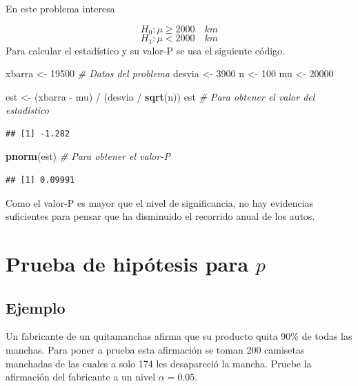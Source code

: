 \documentclass[10pt,]{krantz}
\makeatletter
\newenvironment{Shaded}{\begin{snugshade}}{\end{snugshade}}
\newcommand{\KeywordTok}[1]{\textcolor[rgb]{0.13,0.29,0.53}{\textbf{{#1}}}}
\newcommand{\DecValTok}[1]{\textcolor[rgb]{0.00,0.00,0.81}{{#1}}}
\newcommand{\StringTok}[1]{\textcolor[rgb]{0.31,0.60,0.02}{{#1}}}
\newcommand{\CommentTok}[1]{\textcolor[rgb]{0.56,0.35,0.01}{\textit{{#1}}}}
\newcommand{\NormalTok}[1]{{#1}}
\newenvironment{kframe}{%
\medskip{}
\setlength{\fboxsep}{.8em}
 \def\at@end@of@kframe{}%
 \ifinner\ifhmode%
  \def\at@end@of@kframe{\end{minipage}}%
  \begin{minipage}{\columnwidth}%
 \fi\fi%
 \def\FrameCommand##1{\hskip\@totalleftmargin \hskip-\fboxsep
 \colorbox{shadecolor}{##1}\hskip-\fboxsep
     \hskip-\linewidth \hskip-\@totalleftmargin \hskip\columnwidth}%
 \MakeFramed {\advance\hsize-\width
   \@totalleftmargin\z@ \linewidth\hsize
   \@setminipage}}%
 {\par\unskip\endMakeFramed%
 \at@end@of@kframe}
\renewenvironment{Shaded}{\begin{kframe}}{\end{kframe}}
\makeatother
\begin{document}
En este problema interesa

\[H_0: \mu \ge 2000 \quad km\] \[H_1: \mu < 2000 \quad km\] Para
calcular el estadístico y su valor-P se usa el siguiente código.

\begin{Shaded}
\begin{Highlighting}[]
\NormalTok{xbarra <-}\StringTok{ }\DecValTok{19500}  \CommentTok{# Datos del problema}
\NormalTok{desvia <-}\StringTok{ }\DecValTok{3900}
\NormalTok{n <-}\StringTok{ }\DecValTok{100}
\NormalTok{mu <-}\StringTok{ }\DecValTok{20000}

\NormalTok{est <-}\StringTok{ }\NormalTok{(xbarra -}\StringTok{ }\NormalTok{mu) /}\StringTok{ }\NormalTok{(desvia /}\StringTok{ }\KeywordTok{sqrt}\NormalTok{(n))}
\NormalTok{est  }\CommentTok{# Para obtener el valor del estadístico}
\end{Highlighting}
\end{Shaded}

\begin{verbatim}
## [1] -1.282
\end{verbatim}

\begin{Shaded}
\begin{Highlighting}[]
\KeywordTok{pnorm}\NormalTok{(est)  }\CommentTok{# Para obtener el valor-P}
\end{Highlighting}
\end{Shaded}

\begin{verbatim}
## [1] 0.09991
\end{verbatim}

Como el valor-P es mayor que el nivel de significancia, no hay
evidencias suficientes para pensar que ha disminuido el recorrido anual
de los autos.

\section{\texorpdfstring{Prueba de hipótesis para
\(p\)}{Prueba de hipótesis para p}}\label{prueba-de-hipotesis-para-p}

\subsection*{Ejemplo}\label{ejemplo-63}


Un fabricante de un quitamanchas afirma que su producto quita 90\% de
todas las manchas. Para poner a prueba esta afirmación se toman 200
camisetas manchadas de las cuales a solo 174 les desapareció la mancha.
Pruebe la afirmación del fabricante a un nivel \(\alpha=0.05\).
\end{document}
